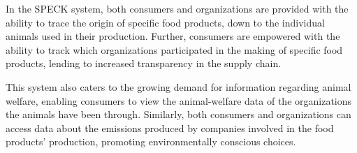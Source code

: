 \documentclass[oneside,a4paper,12pt, colorinlistoftodos]{article} %
\begin{document}

In the SPECK system, both consumers and organizations are provided with the ability to trace the origin of specific food products, down to the individual animals used in their production. Further, consumers are empowered with the ability to track which organizations participated in the making of specific food products, lending to increased transparency in the supply chain.

This system also caters to the growing demand for information regarding animal welfare, enabling consumers to view the animal-welfare data of the organizations the animals have been through. Similarly, both consumers and organizations can access data about the emissions produced by companies involved in the food products' production, promoting environmentally conscious choices.
\end{document}
